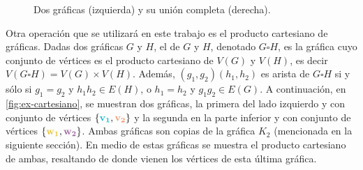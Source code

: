 \begin{figure}[htb!]
    \centering
    \caption{Dos gr\'aficas (izquierda) y su uni\'on completa (derecha).}
\label{fig:ex-unionCompleta}
\end{figure}

Otra operaci\'on que se utilizar\'a en este trabajo es el producto cartesiano de
gr\'aficas. Dadas dos gr\'aficas $G$ y $H$, el  de
$G$ y $H$, denotado $G \square H$, es la gr\'afica cuyo conjunto de v\'ertices
es el producto cartesiano de $V(G)$ y $V(H)$, es decir $V(G \square H) = V(G)
\times V(H)$. Adem\'as, $(g_1,g_2)(h_1,h_2)$ es arista de $G \square H$ si y
s\'olo si $g_1 = g_2$ y $h_1h_2 \in E(H)$, o $h_1 = h_2$ y $g_1g_2 \in E(G)$. A
continuaci\'on, en \cref{fig:ex-cartesiano}, se muestran dos gr\'aficas, la
primera del lado izquierdo y con conjunto de v\'ertices
$\{{\color{azulCielo}\mathbf{v_1}}, {\color{coral}\mathbf{v_2}}\}$ y la segunda en la parte
inferior y con conjunto de v\'ertices
$\{{\color{amarillo}\mathbf{w_1}},{\color{morado}\mathbf{w_2}}\}$. Ambas gr\'aficas son copias de
la gr\'afica $K_2$ (mencionada en la siguiente secci\'on). En medio de estas
gr\'aficas se muestra el producto cartesiano de ambas, resaltando de donde
vienen los v\'ertices de esta \'ultima gr\'afica.

